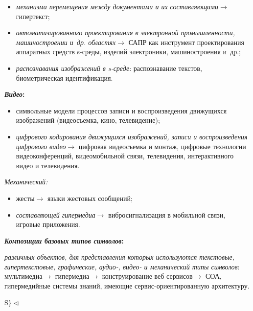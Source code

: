 \begin{multicols}{2}
{{\begin{itemize}
элек\-т\-рон\-ный документооборот;
\item \textit{механизма перемещения между документами и их
составляющими}\;$\rightarrow$ гипертекст;
\item \textit{автоматизированного проектирования в элек\-т\-рон\-ной
промышленности, машиностроении и~др. областях}\;$\rightarrow$ САПР как
инструмент проектирования аппаратных средств s-среды, изделий
электроники, машиностроения и~др.;
\item \textit{распознавания изображений в s-среде}: распознавание текстов,
биометрическая идентификация.
\end{itemize}

\medskip
{\bfseries\textit{Видео}:}
\smallskip

\begin{itemize}
\item символьные модели процессов записи и воспроизведения движущихся
изображений (видеосъемка, кино, телевидение);
\item \textit{циф\-ро\-во\-го кодирования движущихся изображений, записи и
воспроизведения цифрового видео}\;$\rightarrow$ циф\-ро\-вая видеосъемка и
монтаж, цифровые технологии видеоконференций, видеомобильной связи,
телевидения, интерактивного видео и телевидения.
\end{itemize}

\medskip
\textit{Механический:}
\smallskip

\begin{itemize}
\item жесты\;$\rightarrow$ языки жестовых сообщений;
\item \textit{составляющей гипермедиа}\;$\rightarrow$ вибросигнализация в
мобильной связи, игровые приложения.
\end{itemize}

\medskip
{\bfseries\textit{Композиции базовых типов символов}:}
\smallskip

\noindent \textit{различных объектов, для представления которых используются 
текстовые, гипертекстовые, графические, аудио-, видео- и механический типы 
символов}: мультимедиа\;$\rightarrow$ гипермедиа\;$\rightarrow$ конструирование 
веб-сер\-ви\-сов\;$\rightarrow$ СОА, гипермедийные системы знаний, имеющие 
сер\-вис-ори\-ен\-ти\-ро\-ван\-ную ар\-хи\-тек\-туру. {

}
\noindent
 S$\}\triangleleft$

} }

{\small{}}
\end{multicols}
